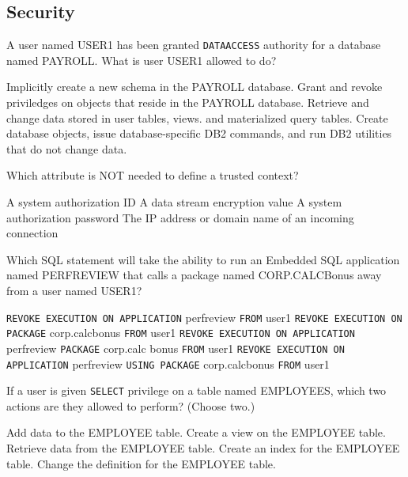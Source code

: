 \documentclass[11pt]{exam}
\begin{document}
\begin{questions}
\newpage
\addpoints
\section{Security}

\question[1]
A user named USER1 has been granted \texttt{DATAACCESS} authority for a database named PAYROLL. What is user USER1 allowed to do?
\begin{choices}
	\choice Implicitly create a new schema in the PAYROLL database.
	\choice Grant and revoke priviledges on objects that reside in the PAYROLL database.
	\choice Retrieve and change data stored in user tables, views. and materialized query tables.
	\choice Create database objects, issue database-specific DB2 commands, and run DB2 utilities that 
	do not change data.
\end{choices}

\question[1]
Which attribute is NOT needed to define a trusted context?
\begin{choices}
\choice A system authorization ID
\choice A data stream encryption value
\choice A system authorization password
\choice The IP address or domain name of an incoming connection
\end{choices}

\question[1]
Which SQL statement will take the ability to run an Embedded SQL application named 
PERF\textunderscore REVIEW that calls a package named CORP.CALC\textunderscore Bonus away from a user named USER1?
\begin{choices}
\choice \texttt{REVOKE EXECUTION ON APPLICATION} perf\textunderscore review \texttt{FROM} user1
\choice \texttt{REVOKE EXECUTION ON PACKAGE} corp.calc\textunderscore bonus \texttt{FROM} user1
\choice \texttt{REVOKE EXECUTION ON APPLICATION} perf\textunderscore review \texttt{PACKAGE} corp.calc
\textunderscore bonus \texttt{FROM} user1
\choice \texttt{REVOKE EXECUTION ON APPLICATION} perf\textunderscore review \texttt{USING PACKAGE} corp.calc\textunderscore bonus \texttt{FROM} user1
\end{choices}


\question[1]
If a user is given \texttt{SELECT} privilege on a table named EMPLOYEES, which two actions are they
allowed to perform? (Choose two.)
\begin{choices}
\choice Add data to the EMPLOYEE table.
\choice Create a view on the EMPLOYEE table.
\choice Retrieve data from the EMPLOYEE table.
\choice Create an index for the EMPLOYEE table.
\choice Change the definition for the EMPLOYEE table.
\end{choices}


\end{questions}
\end{document}
